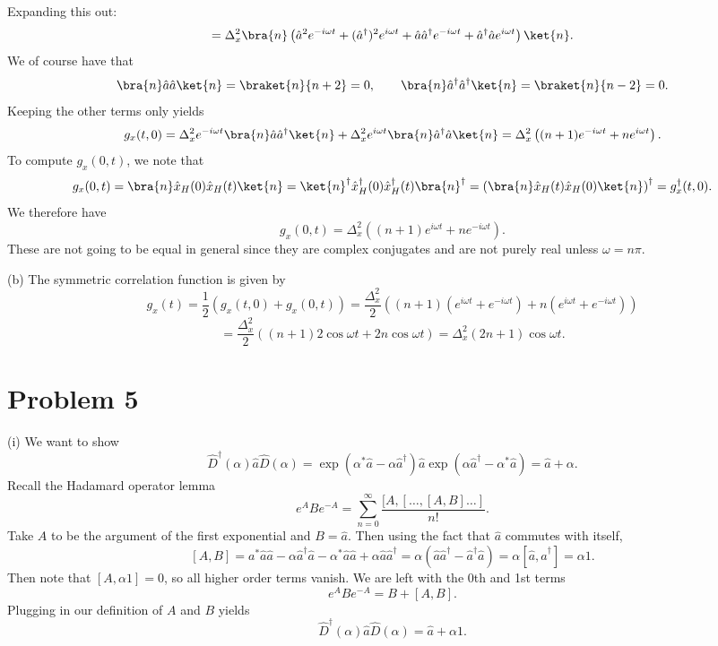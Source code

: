 \documentclass[11pt, letterpaper]{article}
\begin{document}
Expanding this out:
\[
	=\Delta _x^2\bra{n}\left( \hat{a}^2e^{-i\omega t}+(\hat{a} ^\dagger)^2 e^{i\omega t} +\hat{a} \hat{a} ^\dagger e^{-i\omega t} +\hat{a} ^\dagger \hat{a} e^{i\omega t}   \right) \ket{n}
.\]
We of course have that
\[
	\bra{n}\hat{a} \hat{a} \ket{n}=\braket{n}{n+2}=0,\qquad \bra{n}\hat{a} ^\dagger \hat{a} ^\dagger \ket{n}=\braket{n}{n-2}=0
.\]
Keeping the other terms only yields
\[
	g_x(t,0)=\Delta _x^2 e^{-i\omega t} \bra{n} \hat{a} \hat{a} ^\dagger\ket{n}+\Delta _x^2 e^{i\omega t} \bra{n} \hat{a} ^\dagger \hat{a} \ket{n}=\Delta _x^2 \left( (n+1)e^{-i\omega t} + n e^{i\omega t}   \right) 
.\]
To compute $g_x(0,t)$, we note that
\[
	g_x(0,t) = \bra{n} \hat{x} _H(0) \hat{x} _H(t)\ket{n} = \ket{n}^\dagger \hat{x} ^\dagger_H(0) \hat{x} ^\dagger_H(t) \bra{n}^\dagger=\left( \bra{n} \hat{x} _H(t) \hat{x} _H(0) \ket{n} \right) ^\dagger = g_x^\dagger(t,0)
.\]
We therefore have
\[
	g_x(0,t) = \Delta _x^2 \left( (n+1)e^{i\omega t} +ne^{-i\omega t}  \right) 
.\]
These are not going to be equal in general since they are complex conjugates and are not purely real unless $\omega =n\pi $.



(b) The symmetric correlation function is given by
\[
	g_x(t) = \frac{1}{2} \left(g_x(t,0)+g_x(0,t)\right)=\frac{\Delta _x^2}{2} \left( (n+1)\left( e^{i\omega t} +e^{-i\omega t}  \right) +n\left( e^{i\omega t} +e^{-i\omega t}  \right)  \right) 
\]
\[
	=\frac{\Delta _x^2}{2} \left( (n+1)2 \cos \omega t + 2n \cos \omega t \right) =\Delta _x^2 (2n+1)\cos \omega t
.\]


\section{Problem 5}
(i) We want to show
\[
	\hat{D}^\dagger (\alpha ) \hat{a} \hat{D}  (\alpha )=\exp \left( \alpha ^* \hat{a} -\alpha \hat{a} ^\dagger \right) \hat{a} \exp \left( \alpha \hat{a} ^\dagger - \alpha ^* \hat{a}  \right) =\hat{a} +\alpha 
.\]
Recall the Hadamard operator lemma
\[
	e^ABe^{-A} =\sum_{n=0}^{\infty} \frac{[A,[ \ldots ,[A,B]\ldots ]}{n!} 
.\]
Take $A$ to be the argument of the first exponential and $B=\hat{a} $. Then using the fact that $\hat{a} $ commutes with itself,
\[
	[A,B]=a^* \hat{a} \hat{a} -\alpha \hat{a}^\dagger \hat{a} -\alpha ^* \hat{a} \hat{a} +\alpha \hat{a} \hat{a} ^\dagger=\alpha \left( \hat{a} \hat{a} ^\dagger - \hat{a} ^\dagger \hat{a}  \right) =\alpha [\hat{a} ,\hat{a} ^\dagger]=\alpha1
.\]
Then note that $[A,\alpha1]=0$, so all higher order terms vanish. We are left with the 0th and 1st terms
\[
	e^ABe^{-A} =B+[A,B]
.\]
Plugging in our definition of $A$ and $B$ yields
\[
	\hat{D} ^\dagger(\alpha )\hat{a}\hat{D}  (\alpha )=\hat{a} +\alpha 1
.\]
\end{document}
